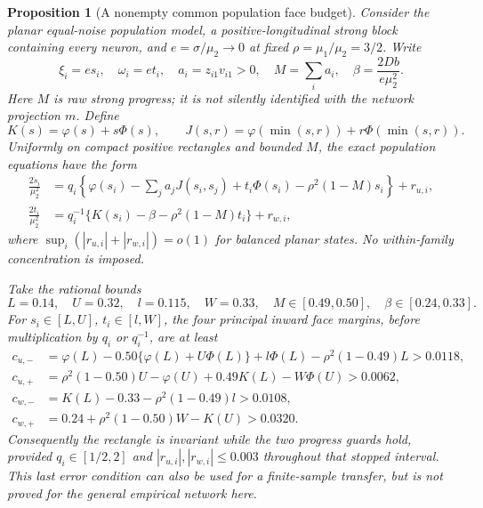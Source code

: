 \documentclass{article} %
\theoremstyle{plain}
\newtheorem{proposition}[theorem]{Proposition}
\theoremstyle{definition}
\theoremstyle{remark}
\begin{document}
\begin{proposition}[A nonempty common population face budget]
\label{sbpos:population-faces}
Consider the planar equal-noise population model, a positive-longitudinal
strong block containing every neuron, and $e=\sigma/\mu_2\to0$ at fixed
$\rho=\mu_1/\mu_2=3/2$. Write
\[
 \xi_i=e s_i,\quad \omega_i=e t_i,\quad
 a_i=z_{i1}v_{i1}>0,\quad M=\sum_i a_i,\quad
 \beta=\frac{2Db}{e\mu_2^2}.
\]
Here $M$ is raw strong progress; it is not silently identified with the
network projection $m$. Define
\[
 K(s)=\varphi(s)+s\Phi(s),\qquad
 J(s,r)=\varphi(\min(s,r))+r\Phi(\min(s,r)).
\]
Uniformly on compact positive rectangles and bounded $M$, the exact
population equations have the form
\begin{align}
 \frac{2\dot s_i}{\mu_2^2}
 &=q_i\left\{\varphi(s_i)-\sum_j a_jJ(s_i,s_j)
        +t_i\Phi(s_i)-\rho^2(1-M)s_i\right\}+r_{u,i},
 \label{sbpos:population-input}\\
 \frac{2\dot t_i}{\mu_2^2}
 &=q_i^{-1}\{K(s_i)-\beta-\rho^2(1-M)t_i\}+r_{w,i},
 \label{sbpos:population-output}
\end{align}
where $\sup_i(|r_{u,i}|+|r_{w,i}|)=o(1)$ for balanced planar states.
No within-family concentration is imposed.

Take the rational bounds
\[
 L=0.14,\quad U=0.32,\quad l=0.115,\quad W=0.33,
 \quad M\in[0.49,0.50],\quad\beta\in[0.24,0.33].
\]
For $s_i\in[L,U]$, $t_i\in[l,W]$, the four principal inward face
margins, before multiplication by $q_i$ or $q_i^{-1}$, are at least
\begin{align*}
 c_{u,-}&=\varphi(L)-0.50\{\varphi(L)+U\Phi(L)\}
                 +l\Phi(L)-\rho^2(1-0.49)L>0.0118,\\
 c_{u,+}&=\rho^2(1-0.50)U-\varphi(U)
                 +0.49K(L)-W\Phi(U)>0.0062,\\
 c_{w,-}&=K(L)-0.33-\rho^2(1-0.49)l>0.0108,\\
 c_{w,+}&=0.24+\rho^2(1-0.50)W-K(U)>0.0320.
\end{align*}
Consequently the rectangle is invariant while the two progress guards
hold, provided $q_i\in[1/2,2]$ and
$|r_{u,i}|,|r_{w,i}|\le0.003$ throughout that stopped interval.
This last error condition can also be used for a finite-sample transfer,
but is not proved for the general empirical network here.
\end{proposition}
\end{document}
